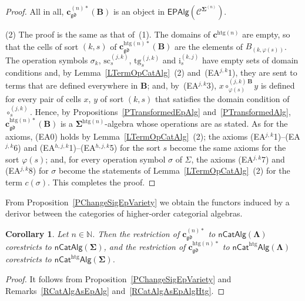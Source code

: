 \documentclass[a4paper, reqno]{amsbook}
\newcommand{\sig}[1]{\mathbf{#1}}             %
\newcommand{\spec}[1]{\boldsymbol{\mathcal{#1}}} %
\newcommand{\gd}{\mathfrak{gd}}              %
\newcommand{\htg}{\mathrm{htg}}                %
\newcommand{\src}{\mathrm{sc}}
\newcommand{\tgt}{\mathrm{tg}}
\theoremstyle{plain}
\newtheorem{corollary}[theorem]{Corollary}
\theoremstyle{definition}
\begin{document}
\begin{proof}
All in all, $\mathbf{c}^{(n)\ast}_{\gd}(\mathbf{B})$ is an object in $\mathsf{EPAlg}(\spec{C}^{\sig{\Sigma}^{(n)}})$.

(2) The proof is the same as that of~(1).
The domains of $\mathbf{c}^{\htg(n)}$ are empty, so that the cells of sort $(k,s)$ of $\mathbf{c}^{\htg(n)\ast}_{\gd}(\mathbf{B})$ are the elements of $B_{(k,\varphi(s))}$.
The operation symbols $\sigma_{k}$, $\src^{(j,k)}_{s}$, $\tgt^{(j,k)}_{s}$ and $\mathrm{i}^{(k,j)}_{s}$ have empty sets of domain conditions and, by Lemma~\ref{LTermOpCatAlg}~(2) and~(EA$^{j,k}$1), they are sent to terms that are defined everywhere in $\mathbf{B}$; and, by~(EA$^{j,k}$3), $x\circ^{(j,k)\,\mathbf{B}}_{\varphi(s)}y$ is defined for every pair of cells $x$, $y$ of sort $(k,s)$ that satisfies the domain condition of $\circ^{(j,k)}_{s}$.
Hence, by Propositions~\ref{PTransformedEpAlg} and~\ref{PTransformedAlg}, $\mathbf{c}^{\htg(n)\ast}_{\gd}(\mathbf{B})$ is a $\sig{\Sigma}^{\htg(n)}$-algebra whose operations are as stated.
As for the axioms, (EA0) holds by Lemma~\ref{LTermOpCatAlg}~(2); the axioms (EA$^{j,k}$1)--(EA$^{j,k}$6) and (EA$^{h,j,k}$1)--(EA$^{h,j,k}$5) for the sort $s$ become the same axioms for the sort $\varphi(s)$; and, for every operation symbol $\sigma$ of $\Sigma$, the axioms (EA$^{j,k}$7) and (EA$^{j,k}$8) for $\sigma$ become the statements of Lemma~\ref{LTermOpCatAlg}~(2) for the term $c(\sigma)$. This completes the proof.
\end{proof}

From Proposition~\ref{PChangeSigEpVariety} we obtain the functors induced by a derivor between the categories of higher-order categorial algebras.

\begin{corollary}\label{CChangeSigFunctor}
Let $n\in\mathbb{N}$.
Then the restriction of $\mathbf{c}^{(n)\ast}_{\gd}$ to $\mathsf{nCatAlg}(\sig{\Lambda})$ corestricts to $\mathsf{nCatAlg}(\sig{\Sigma})$, and the restriction of $\mathbf{c}^{\htg(n)\ast}_{\gd}$ to $\mathsf{nCat}^{\htg}\mathsf{Alg}(\sig{\Lambda})$ corestricts to $\mathsf{nCat}^{\htg}\mathsf{Alg}(\sig{\Sigma})$.
\end{corollary}
\begin{proof}
It follows from Proposition~\ref{PChangeSigEpVariety} and Remarks~\ref{RCatAlgAsEpAlg} and~\ref{RCatAlgAsEpAlgHtg}.
\end{proof}
\end{document}
